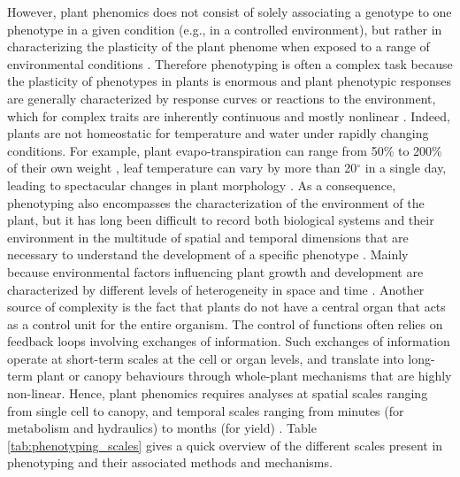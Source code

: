However, plant phenomics does not consist of solely associating a genotype to one phenotype in a given condition (e.g., in a controlled
environment), but rather in characterizing the plasticity of the
plant phenome when exposed to a range of environmental conditions \parencite{tardieu_plant_2017}. Therefore phenotyping is often a complex task because the plasticity of phenotypes in plants is enormous and plant phenotypic responses are generally characterized by response curves or reactions to the environment, which for complex traits are inherently continuous and mostly nonlinear \parencite{sultan2003phenotypic}. Indeed, plants are not homeostatic for temperature and water under rapidly changing conditions. For example, plant evapo-transpiration can range from 50\% to 200\% of their own weight \parencite{vadez2014transpiration}, leaf temperature can vary by more than 20$^{\circ}$ in a single day, leading to spectacular changes in plant morphology \parencite{caldeira2014hydraulic}. As a consequence, phenotyping also encompasses the characterization of the environment of the plant, but it has long been difficult to record both biological systems and their environment in the multitude of spatial and temporal dimensions that are necessary to understand
the development of a specific phenotype \parencite{pieruschka2019plant}. Mainly because environmental factors influencing plant growth and development are characterized by different levels of heterogeneity in space and time \parencite{hodge2004plastic}.
Another source of complexity is the fact that plants do not have a central organ that acts as a control unit for the entire organism. The control of functions often relies on feedback loops involving exchanges of information. Such exchanges of information operate at short-term scales at the cell or organ levels, and translate into long-term plant or canopy behaviours through whole-plant mechanisms that are highly non-linear. Hence, plant phenomics requires analyses at spatial scales ranging from single cell to canopy, and temporal scales ranging from minutes (for metabolism and hydraulics) to months (for yield) \parencite{tardieu_plant_2017}. Table \ref{tab:phenotyping_scales} gives a quick overview of the different scales present in phenotyping and their associated methods and mechanisms.

